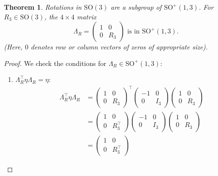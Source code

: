\documentclass{amsart}
\newtheorem{theorem}{Theorem}[section]
\theoremstyle{definition}
\theoremstyle{remark}
\begin{document}
\begin{theorem}\label{thm:so3_rotations_in_so13}
  Rotations in $\mathrm{SO}(3)$ are a subgroup of $\mathrm{SO}^+(1,3)$. For $R_3\in\mathrm{SO}(3)$, the $4 \times 4$ matrix
  \begin{equation*}
  \Lambda_R =
  \begin{pmatrix}
    1 & 0 \\
    0 & R_3
  \end{pmatrix} \text{ is in } \mathrm{SO}^+(1,3).
  \end{equation*}
  (Here, $0$ denotes row or column vectors of zeros of appropriate size).
\end{theorem}
\begin{proof}
  We check the conditions for $\Lambda_R \in \mathrm{SO}^+(1,3)$:
  \begin{enumerate}
      \item $\Lambda_R^\top \eta \Lambda_R = \eta$:
        \begin{align*}
        \Lambda_R^\top\eta \Lambda_R &=
        \begin{pmatrix}
            1 & 0 \\
            0 & R_3
        \end{pmatrix}^\top
        \begin{pmatrix}
            -1 & 0 \\
            0 & I_3
        \end{pmatrix}
        \begin{pmatrix}
            1 & 0 \\
            0 & R_3
        \end{pmatrix} \\
        &=
        \begin{pmatrix}
            1 & 0 \\
            0 & R_3^\top
        \end{pmatrix}
        \begin{pmatrix}
            -1 & 0 \\
            0 & I_3
        \end{pmatrix}
        \begin{pmatrix}
            1 & 0 \\
            0 & R_3
        \end{pmatrix} \\
        &=
        \begin{pmatrix}
            1 & 0 \\
            0 & R_3^\top
        \end{pmatrix}

\end{align*}
\end{enumerate}
\end{proof}
\end{document}
